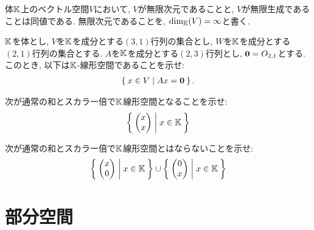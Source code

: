 \begin{remark}
体$\mathbb{K}$上のベクトル空間$V$において,
$V$が無限次元であることと,
$V$が無限生成であることは同値である.
無限次元であることを,
$\dim_{\mathbb{K}}(V)=\infty$と書く.
\end{remark}

\begin{quiz}
  $\mathbb{K}$を体とし,
  $V$を$\mathbb{K}$を成分とする$(3,1)$行列の集合とし,
  $W$を$\mathbb{K}$を成分とする$(2,1)$行列の集合とする.
  $A$を$\mathbb{K}$を成分とする$(2,3)$行列とし,
  $\boldsymbol{0}=O_{2,1}$とする.
  このとき, 以下は$\mathbb{K}$-線形空間であることを示せ:
  \begin{align*}
    \Set{x\in V|Ax=\boldsymbol{0}}.
  \end{align*}
\end{quiz}

\begin{quiz}
  次が通常の和とスカラー倍で$\mathbb{K}$線形空間となることを示せ:
  \begin{align*}
    \Set{\begin{pmatrix}x\\x\end{pmatrix}|x\in\mathbb{K}}
  \end{align*}
\end{quiz}

\begin{quiz}
  次が通常の和とスカラー倍で$\mathbb{K}$線形空間とはならないことを示せ:
  \begin{align*}
    \Set{\begin{pmatrix}x\\0\end{pmatrix}|x\in\mathbb{K}}
    \cup \Set{\begin{pmatrix}0\\x\end{pmatrix}|x\in\mathbb{K}}
  \end{align*}
\end{quiz}

\chapter{部分空間}
\label{chap:subspace}
